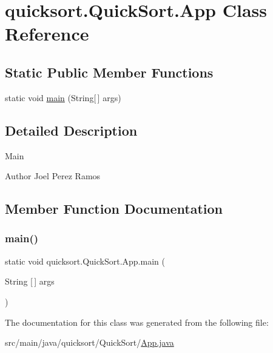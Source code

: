 \hypertarget{classquicksort_1_1_quick_sort_1_1_app}{}\section{quicksort.\+Quick\+Sort.\+App Class Reference}
\label{classquicksort_1_1_quick_sort_1_1_app}
\subsection*{Static Public Member Functions}
\begin{DoxyCompactItemize}
\item 
static void \hyperlink{classquicksort_1_1_quick_sort_1_1_app_ac7610815317faca598652bc73ba5364e}{main} (String\mbox{[}$\,$\mbox{]} args)
\end{DoxyCompactItemize}


\subsection{Detailed Description}
Main \begin{DoxyAuthor}{Author}
Joel Perez Ramos 
\end{DoxyAuthor}


\subsection{Member Function Documentation}
\hypertarget{classquicksort_1_1_quick_sort_1_1_app_ac7610815317faca598652bc73ba5364e}{}\label{classquicksort_1_1_quick_sort_1_1_app_ac7610815317faca598652bc73ba5364e} 
\subsubsection{\texorpdfstring{main()}{main()}}
{\footnotesize\ttfamily static void quicksort.\+Quick\+Sort.\+App.\+main (\begin{DoxyParamCaption}\item[{String \mbox{[}$\,$\mbox{]}}]{args }\end{DoxyParamCaption})\hspace{0.3cm}{\ttfamily [static]}}



The documentation for this class was generated from the following file\+:\begin{DoxyCompactItemize}
\item 
src/main/java/quicksort/\+Quick\+Sort/\hyperlink{_app_8java}{App.\+java}\end{DoxyCompactItemize}
